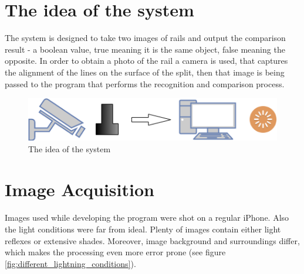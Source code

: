 \section{The idea of the system}
The system is designed to take two images of rails and output the comparison result - a boolean value, true meaning it is the same object, false meaning the opposite. In order to obtain a photo of the rail a camera is used, that captures the alignment of the lines on the surface of the split, then that image is being passed to the program that performs the recognition and comparison process.
\begin{figure}[h]
	\centering
	\includegraphics[width=\textwidth]{images/deployment_diagram}
	\caption{The idea of the system}
\end{figure}

\section{Image Acquisition}
\paragraph{}
Images used while developing the program were shot on a regular iPhone. Also the light conditions were far from ideal. Plenty of images contain either light reflexes or extensive shades. Moreover, image background and surroundings differ, which makes the processing even more error prone (see figure \ref{fig:different_lightning_conditions}).

